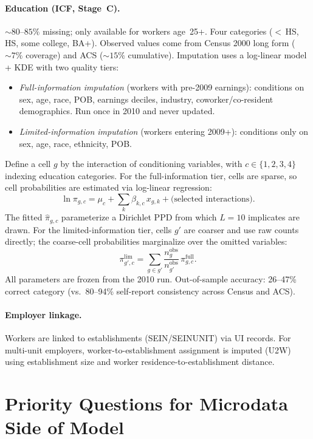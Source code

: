 \documentclass[11pt]{article}
\begin{document}
\paragraph{Education (ICF, Stage~C).}
${\sim}80$--$85\%$ missing; only available for workers age~25+. Four categories ({$<$}\,HS, HS, some college, BA+). Observed values come from Census 2000 long form (${\sim}7\%$ coverage) and ACS (${\sim}15\%$ cumulative). Imputation uses a log-linear model + KDE with two quality tiers:
\begin{itemize}[nosep]
    \item \emph{Full-information imputation} (workers with pre-2009 earnings): conditions on sex, age, race, POB, earnings deciles, industry, coworker/co-resident demographics. Run once in 2010 and never updated.
    \item \emph{Limited-information imputation} (workers entering 2009+): conditions only on sex, age, race, ethnicity, POB.
\end{itemize}
Define a cell $g$ by the interaction of conditioning variables, with $c \in \{1,2,3,4\}$ indexing education categories. For the full-information tier, cells are sparse, so cell probabilities are estimated via log-linear regression:
\[
    \ln \pi_{g,c} = \mu_c + \sum_k \beta_{k,c}\, x_{g,k} + \text{(selected interactions)}.
\]
The fitted $\hat{\pi}_{g,c}$ parameterize a Dirichlet PPD from which $L=10$ implicates are drawn. For the limited-information tier, cells $g'$ are coarser and use raw counts directly; the coarse-cell probabilities marginalize over the omitted variables:
\[
    \pi_{g',c}^{\text{lim}} = \sum_{g \in g'} \frac{n_g^{\text{obs}}}{n_{g'}^{\text{obs}}}\, \pi_{g,c}^{\text{full}}.
\]
All parameters are frozen from the 2010 run. Out-of-sample accuracy: 26--47\% correct category (vs.\ 80--94\% self-report consistency across Census and ACS).

\paragraph{Employer linkage.}
Workers are linked to establishments (SEIN/SEINUNIT) via UI records. For multi-unit employers, worker-to-establishment assignment is imputed (U2W) using establishment size and worker residence-to-establishment distance.

\section*{Priority Questions for Microdata Side of Model}
\end{document}
